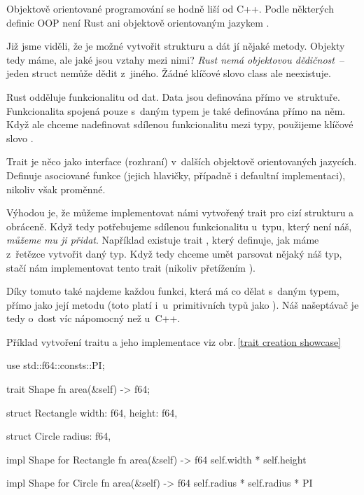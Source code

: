 \documentclass[main.tex]{subfiles}
\begin{document}

Objektově orientované programování se hodně liší od C++. Podle některých definic OOP není
Rust ani objektově orientovaným jazykem \cite[kapitola\,17]{thebook}.

Již jsme viděli, že je možné vytvořit strukturu a dát jí nějaké metody. Objekty tedy
máme, ale jaké jsou vztahy mezi nimi? \emph{Rust nemá objektovou dědičnost}~-- jeden
struct nemůže dědit z~jiného. Žádné klíčové slovo class ale neexistuje.


Rust odděluje funkcionalitu od dat. Data jsou definována přímo ve~struktuře. Funkcionalita
spojená pouze s~daným typem je také definována přímo na něm. Když ale chceme nadefinovat
sdílenou funkcionalitu mezi typy, použijeme klíčové slovo .

Trait je něco jako interface (rozhraní) v~dalších objektově orientovaných jazycích.
Definuje asociované funkce (jejich hlavičky, případně i defaultní implementaci), nikoliv
však proměnné. \cite[sekce\,10.2]{thebook}

Výhodou je, že můžeme implementovat námi vytvořený trait pro cizí strukturu a obráceně.
Když tedy potřebujeme sdílenou funkcionalitu u~typu, který není náš, \emph{můžeme mu ji
    přidat}. Například existuje trait , který definuje, jak máme z~řetězce
vytvořit daný typ. Když tedy chceme umět parsovat nějaký náš typ, stačí nám implementovat
tento trait (nikoliv přetížením ).
\cite[str/trait.FromStr]{ruststd}
\cite[io/basic\_istream/operator\_gtgt]{cppreference}

Díky tomuto také najdeme každou funkci, která má co dělat s~daným typem, přímo jako její
metodu (toto platí i~u~primitivních typů jako ). Náš našeptávač je tedy o~dost
víc nápomocný než u~C++.

Příklad vytvoření traitu a jeho implementace viz obr.\,\ref{trait creation showcase}

\obrazek
\begin{rustcode}
    use std::f64::consts::PI;

    trait Shape {
        fn area(&self) -> f64;
    }

    struct Rectangle {
        width: f64,
        height: f64,
    }

    struct Circle {
        radius: f64,
    }

    impl Shape for Rectangle {
        fn area(&self) -> f64 {
            self.width * self.height
        }
    }

    impl Shape for Circle {
        fn area(&self) -> f64 {
            self.radius * self.radius * PI
        }
    }
\end{rustcode}
\end{document}
